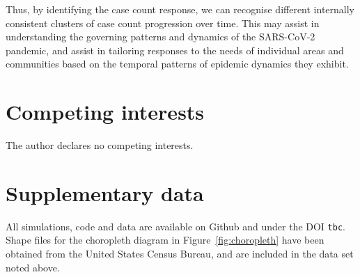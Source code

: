 \documentclass{article}
\begin{document}
Thus, by identifying the case count response, we can recognise different internally consistent clusters of case count progression over time. This may assist in understanding the governing patterns and dynamics of the SARS-CoV-2 pandemic, and assist in tailoring responses to the needs of individual areas and communities based on the temporal patterns of epidemic dynamics they exhibit.


\section*{Competing interests} %
\label{sec:competing_interests}

The author declares no competing interests.


\section*{Supplementary data} %
\label{sec:supplementary_data}

All simulations, code and data are available on Github and under the DOI \texttt{tbc}. Shape files for the choropleth diagram in Figure~\ref{fig:choropleth} have been obtained from the United States Census Bureau, and are included in the data set noted above.



\end{document}
